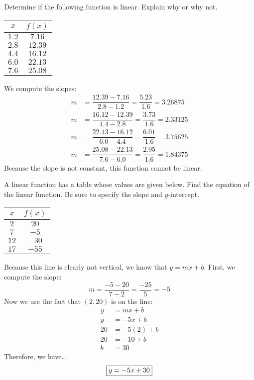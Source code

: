 \documentclass[11pt,letterpaper]{article}
\begin{document}

 Determine if the following function is linear. Explain why or why not.
	\begin{table}[!ht]
	\centering
	\begin{tabular}{c|c}
	$x$ & $f(x)$ \\ \hline
	$1.2$ & $7.16$ \\
	$2.8$ & $12.39$ \\
	$4.4$ & $16.12$ \\
	$6.0$ & $22.13$ \\
	$7.6$ & $25.08$
	\end{tabular}
	\end{table}

\sol We compute the slopes:
	\[
	\begin{aligned}
	m&= \dfrac{12.39 - 7.16}{2.8 - 1.2}= \dfrac{5.23}{1.6}= 3.26875 \\[0.3cm]
	m&= \dfrac{16.12 - 12.39}{4.4 - 2.8}= \dfrac{3.73}{1.6}= 2.33125 \\[0.3cm]
	m&= \dfrac{22.13 - 16.12}{6.0 - 4.4}= \dfrac{6.01}{1.6}= 3.75625 \\[0.3cm]
	m&= \dfrac{25.08 - 22.13}{7.6 - 6.0}= \dfrac{2.95}{1.6}= 1.84375
	\end{aligned}
	\]
Because the slope is not constant, this function cannot be linear. 



\newpage



 A linear function has a table whose values are given below. Find the equation of the linear function. Be sure to specify the slope and $y$-intercept.
	\begin{table}[!ht]
	\centering
	\begin{tabular}{c|c}
	$x$ & $f(x)$ \\ \hline
	$2$ & $20$ \\
	$7$ & $-5$ \\
	$12$ & $-30$ \\
	$17$ & $-55$
	\end{tabular}
	\end{table}

\sol Because this line is clearly not vertical, we know that $y= mx + b$. First, we compute the slope:
	\[
	m= \dfrac{-5 - 20}{7 - 2}= \dfrac{-25}{5}= -5
	\]
Now we use the fact that $(2, 20)$ is on the line:
	\[
	\begin{aligned}
	y&= mx + b \\[0.3cm]
	y&= -5x + b \\[0.3cm] 
	20&= -5(2) + b \\[0.3cm]
	20&= -10 + b \\[0.3cm]
	b&= 30
	\end{aligned}
	\]
Therefore, we have\dots
	\[
	\framebox{$y= -5x + 30$}
	\]
\end{document}
